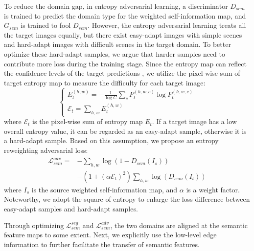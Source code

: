 \documentclass[sigconf]{acmart}
\begin{document}
\par To reduce the domain gap, in entropy adversarial learning, a discriminator $D_{sem}$ is trained to predict the domain type for the weighted self-information map, and $G_{sem}$ is trained to fool $D_{sem}$. However, the entropy adversarial learning treats all the target images equally, but there exist easy-adapt images with simple scenes and hard-adapt images with difficult scenes in the target domain. To better optimize these hard-adapt samples, we argue that harder samples need to contribute more loss during the training stage. Since the entropy map can reflect the confidence levels of the target predictions \cite{vu2019advent}, we utilize the pixel-wise sum of target entropy map to measure the difficulty for each target image: 
\begin{equation}
    \left\{
        \begin{array}{l}
            E_{t}^{(h, w)}=-\frac{1}{\log C} \sum\limits_{c} P_{t}^{(h, w, c)} \log P_{t}^{(h, w, c)} \\
            \mathcal{E}_{t}=\sum\limits_{h, w} E_{t}^{(h, w)}
        \end{array}
    \right.
   \label{eq:1.5}
\end{equation}
where $\mathcal{E}_{t}$ is the pixel-wise sum of entropy map $E_{t}$. If a target image has a low overall entropy value, it can be regarded as an easy-adapt sample, otherwise it is a hard-adapt sample. Based on this assumption, we propose an entropy reweighting adversarial loss:
\begin{equation}
    \begin{split}
        \mathcal{L}_{sem}^{a d v}=&-\sum_{h, w} \log \left(1-D_{sem}\left(I_{s}\right)\right) \\
        &-\left(1+\left(\alpha \mathcal{E}_{t}\right)^{2} \right)\sum_{h, w} \log \left(D_{sem}\left(I_{t}\right)\right)
    \end{split}
\label{eq:2}
\end{equation}
where $I_{s}$ is the source weighted self-information map, and $\alpha$ is a weight factor. Noteworthy, we adopt the square of entropy to enlarge the loss difference between easy-adapt samples and hard-adapt samples. 

\par Through optimizing $\mathcal{L}_{s e m}^{seg}$ and $\mathcal{L}_{s e m}^{a d v}$, the two domains are aligned at the semantic feature maps to some extent. Next, we explicitly use the low-level edge information to further facilitate the transfer of semantic features.
\end{document}
